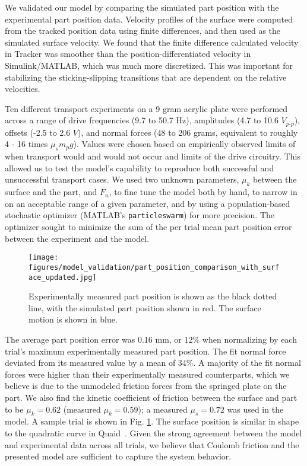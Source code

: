We validated our model by comparing the simulated part position with the experimental part position data. 
%
Velocity profiles of the surface were computed from the tracked position data using finite differences, and then used as the simulated surface velocity.
%
We found that the finite difference calculated velocity in Tracker was smoother than the position-differentiated velocity in Simulink/MATLAB, which was much more discretized.
%
This was important for stabilizing the sticking-slipping transitions that are dependent on the relative velocities.

Ten different transport experiments on a 9 gram acrylic plate were performed across a range of drive frequencies (9.7 to 50.7 Hz), amplitudes (4.7 to 10.6 $V_{p\text{-}p}$), offsets (-2.5 to 2.6 $V$), and normal forces (48 to 206 grams, equivalent to roughly 4 - 16 times $\mu_s m_p g$).
%
Values were chosen based on empirically observed limits of when transport would and would not occur and limits of the drive circuitry. This allowed us to test the model's capability to reproduce both successful and unsuccessful transport cases.
% 
We used two unknown parameters, $\mu_k$ between the surface and the part, and $F_n$, to fine tune the model both by hand, to narrow in on an acceptable range of a given parameter, and by using a population-based stochastic optimizer (MATLAB's \texttt{particleswarm}) for more precision. 
%
The optimizer sought to minimize the sum of the per trial mean part position error between the experiment and the model.

\begin{figure}[b]
    \vspace{\shift}
    \centering
    \texttt{[image: figures/model\_validation/part\_position\_comparison\_with\_surface\_updated.jpg]}
    \caption{Experimentally measured part position is shown as the black dotted line, with the simulated part position shown in red. The surface motion is shown in blue.}
    \label{figure: model validation}
\end{figure}
%
The average part position error was 0.16 mm, or $12\%$ when normalizing by each trial's maximum experimentally measured part position. 
%
The fit normal force deviated from its measured value by a mean of 34\%. 
%
A majority of the fit normal forces were higher than their experimentally measured counterparts, which we believe is due to the unmodeled friction forces from the springed plate on the part.
%
We also find the kinetic coefficient of friction between the surface and part to be $\mu_k=0.62$ (measured $\mu_k = 0.59$); a measured $\mu_s=0.72$ was used in the model.
%
A sample trial is shown in Fig. \ref{figure: model validation}.
%
The surface position is similar in shape to the quadratic curve in Quaid~\cite{quaid1999feeder}.
%
Given the strong agreement between the model and experimental data across all trials, we believe that Coulomb friction and the presented model are sufficient to capture the system behavior.